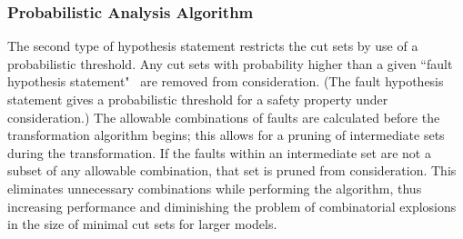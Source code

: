 \subsubsection{Probabilistic Analysis Algorithm}
\label{sec:probAlg}
The second type of hypothesis statement restricts the cut sets by use of a probabilistic threshold. Any cut sets with probability higher than a given ``fault hypothesis statement"~\cite{stewart2020safety} are removed from consideration. (The fault hypothesis statement gives a probabilistic threshold for a safety property under consideration.) The allowable combinations of faults are calculated before the transformation algorithm begins; this allows for a pruning of intermediate sets during the transformation. If the faults within an intermediate set are not a subset of any allowable combination, that set is pruned from consideration. This eliminates unnecessary combinations while performing the algorithm, thus increasing performance and diminishing the problem of combinatorial explosions in the size of minimal cut sets for larger models. 


\begin{comment}
\begin{algorithm}[H]
	$\mathcal{F} = \{\}$ : fault combinations above threshold \;
	$\mathcal{Q}$ : faults, $q_i$, arranged with probability high to low \;
	$\mathcal{R} = \mathcal{Q}$ , with $r \in \mathcal{R}$\;
	\While{$\mathcal{Q} \neq \{\} \land \mathcal{R} \neq \{\}$ }{
		$q =$ removePriorityElement($\mathcal{Q}$) \;
		\For{$i=0:|\mathcal{R}|$}{
			$prob = q \times r_i$ \;
			\eIf{prob $<$ threshold}{
				removeTail($\mathcal{R}, i:|\mathcal{R}|$)\;
			}{
				add($\{q, r_i\}, \mathcal{Q}$)\;
				add($\{q, r_i\}, \mathcal{F}$)\;
			} %
		} %
	} %
	\caption{Allowable Fault Combinations Algorithm}
	\label{alg:comb}
\end{algorithm}
\end{comment}
